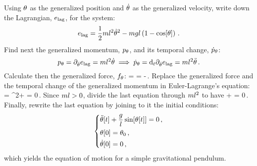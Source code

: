 Using $\theta$ as the generalized position and $\dot{\theta}$ as the generalized velocity, write down the Lagrangian, $e_\text{lag}$, for the system:
\begin{equation}\label{eq:lagrangiansimplependulum}
e_\text{lag} = \dfrac{1}{2}ml^2\dot{\theta}^2 - mgl\left(1 - \cos\!\left[{\theta}\right]\right)\,.
\end{equation}
Find next the generalized momentum, ${p}_{\theta}$, and its temporal change, ${\dot{p}}_{\theta}$:
\begin{equation}\label{eq:genmomentumanditstempchange}
{p}_{\theta}   = \partial_{\dot{\theta}}{e_\text{lag}} = ml^2\dot{\theta}\implies
{\dot{p}}_{\theta} = \text{d}_{t}\partial_{\dot{\theta}}{e_\text{lag}} = ml^2\ddot{\theta}\,.
\end{equation}
Calculate then the generalized force, ${f}_{\theta}$:
\beq
\igforce\angpos = \ipd{\angpos}{\lag} = -\mass\grav\length\sin\vat\angpos\,.
\eeq
Replace the generalized force and the temporal change of the generalized momentum in Euler-Lagrange's equation:
\beq
\igforce\angpos = \dtigmom\angpos \implies
\mass\length^2\angacc + \mass\grav\length\sin\vat\angpos = 0\,.
\eeq
Since $ml > 0$, divide the last equation through $ml^2$ to have
\beq
\angacc + \dfrac{\grav}{\length}\sin\vat\angpos = 0\,.
\eeq
Finally, rewrite the last equation by joining to it the initial conditions:
\begin{equation}\label{eq:mathmodelsimppend}
  \begin{dcases}
    \ddot{\theta}\!\left[{t}\right] + \dfrac{g}{l}\sin\!\left[{\theta\!\left[{t}\right]}\right] = 0\,,\\
    \theta\!\left[{0}\right] = \theta_0\,,\\
    \dot{\theta}\!\left[{0}\right] = 0\,,
  \end{dcases}
\end{equation}
which yields the equation of motion for a simple gravitational pendulum.
